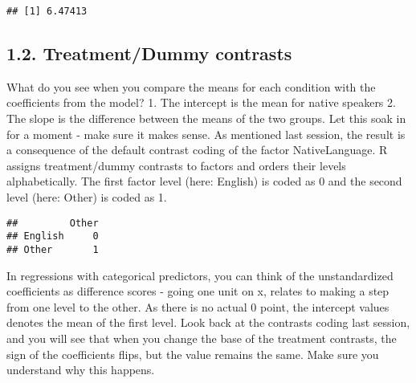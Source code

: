 \documentclass[
]{article}
\newenvironment{Shaded}{\begin{snugshade}}{\end{snugshade}}
\newcommand{\KeywordTok}[1]{\textcolor[rgb]{0.13,0.29,0.53}{\textbf{#1}}}
\newcommand{\NormalTok}[1]{#1}
\newcommand{\OperatorTok}[1]{\textcolor[rgb]{0.81,0.36,0.00}{\textbf{#1}}}
\newcommand{\StringTok}[1]{\textcolor[rgb]{0.31,0.60,0.02}{#1}}
\begin{document}
\begin{Shaded}
\end{Shaded}

\begin{verbatim}
## [1] 6.47413
\end{verbatim}

\hypertarget{treatmentdummy-contrasts}{%
\subsection{1.2. Treatment/Dummy
contrasts}\label{treatmentdummy-contrasts}}

What do you see when you compare the means for each condition with the
coefficients from the model? 1. The intercept is the mean for native
speakers 2. The slope is the difference between the means of the two
groups. Let this soak in for a moment - make sure it makes sense. As
mentioned last session, the result is a consequence of the default
contrast coding of the factor NativeLanguage. R assigns treatment/dummy
contrasts to factors and orders their levels alphabetically. The first
factor level (here: English) is coded as 0 and the second level (here:
Other) is coded as 1.

\begin{Shaded}
\end{Shaded}

\begin{verbatim}
##         Other
## English     0
## Other       1
\end{verbatim}

In regressions with categorical predictors, you can think of the
unstandardized coefficients as difference scores - going one unit on x,
relates to making a step from one level to the other. As there is no
actual 0 point, the intercept values denotes the mean of the first
level. Look back at the contrasts coding last session, and you will see
that when you change the base of the treatment contrasts, the sign of
the coefficients flips, but the value remains the same. Make sure you
understand why this happens.
\end{document}
